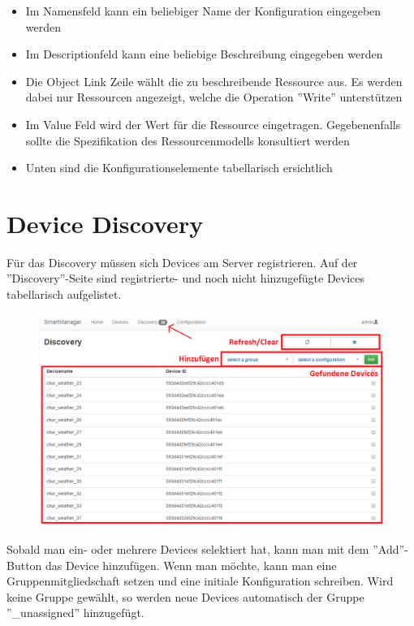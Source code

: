 \begin{itemize}
\item Im Namensfeld kann ein beliebiger Name der Konfiguration eingegeben werden
\item Im Descriptionfeld kann eine beliebige Beschreibung eingegeben werden
\item Die Object Link Zeile wählt die zu beschreibende Ressource aus. Es werden dabei nur Ressourcen angezeigt, welche die Operation ''Write'' unterstützen
\item Im Value Feld wird der Wert für die Ressource eingetragen. Gegebenenfalls sollte die Spezifikation des Ressourcenmodells konsultiert werden
\item Unten sind die Konfigurationselemente tabellarisch ersichtlich
\end{itemize}

\section{Device Discovery}
Für das Discovery müssen sich Devices am Server registrieren. Auf der ''Discovery''-Seite sind registrierte- und noch nicht hinzugefügte Devices tabellarisch aufgelistet.

\begin{figure}[H]
\includegraphics[scale=0.57]{../05_Schlussbericht/images/benutzeranleitung/discovery.png}
\end{figure}  

Sobald man ein- oder mehrere Devices selektiert hat, kann man mit dem ''Add''-Button das Device hinzufügen. Wenn man möchte, kann man eine Gruppenmitgliedschaft setzen und eine initiale Konfiguration schreiben. Wird keine Gruppe gewählt, so werden neue Devices automatisch der Gruppe ''\_unassigned'' hinzugefügt.

